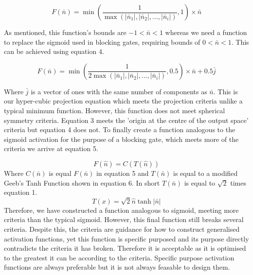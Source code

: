 \documentclass[onecolumn]{article}
\begin{document}
    \begin{equation}
        \label{eqn: Hyper-Cubic Projection Equation}
        F\left(\bar{n}\right)=\min\left(\frac{1}{\max\left(\left|\bar{n}_{1}\right|,\left|\bar{n}_{2}\right|,...,\left|\bar{n}_{i}\right|\right)},1\right)\times\bar{n}
    \end{equation}

    As mentioned, this function's bounds are $-1<\bar{n}<1$ whereas we need a function to replace the sigmoid used in blocking gates, requiring bounds of $0<\bar{n}<1$. This can be achieved using equation 4.
    
    \begin{equation}
        \label{eqn: Hyper-Cubic Projection Equation 2}
        F\left(\bar{n}\right)=\min\left(\frac{1}{2\max\left(\left|\bar{n}_{1}\right|,\left|\bar{n}_{2}\right|,...,\left|\bar{n}_{i}\right|\right)},0.5\right)\times\bar{n} + 0.5\bar{j}
    \end{equation}

    Where $\bar{j}$ is a vector of ones with the same number of components as $\bar{n}$. This is our hyper-cubic projection equation which meets the projection criteria unlike a typical minimum function. However, this function does not meet spherical symmetry criteria. Equation 3 meets the 'origin at the centre of the output space' criteria but equation 4 does not. To finally create a function analogous to the sigmoid activation for the purpose of a blocking gate, which meets more of the criteria we arrive at equation 5.
    
    \begin{equation}
        \label{eqn: Geeb's-Sigmoid}
        F(\hat{n}) = C(T(\hat{n}))
    \end{equation}
    Where $C(\bar{n})$ is equal $F(\bar{n})$ in equation 5 and $T(\bar{n})$ is equal to a modified Geeb's Tanh Function shown in equation 6. In short $T(\bar{n})$ is equal to $\sqrt{2}$ times equation 1.
    \begin{equation}
        \label{eqn: Geeb's-Sigmoid}
        T(x) = \sqrt{2}\hat{n}\tanh|\bar{n}|
    \end{equation}
    Therefore, we have constructed a function analogous to sigmoid, meeting more criteria than the typical sigmoid. However, this final function still breaks several criteria. Despite this, the criteria are guidance for how to construct generalised activation functions, yet this function is specific purposed and its purpose directly contradicts the criteria it has broken. Therefore it is acceptable as it is optimised to the greatest it can be according to the criteria. Specific purpose activation functions are always preferable but it is not always feasable to design them. 
\end{document}

